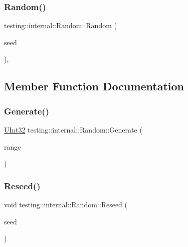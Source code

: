 \subsubsection{\texorpdfstring{Random()}{Random()}}
{\footnotesize\ttfamily testing\+::internal\+::\+Random\+::\+Random (\begin{DoxyParamCaption}\item[{\mbox{\hyperlink{namespacetesting_1_1internal_a40d4fffcd2bf56f18b1c380615aa85e3}{U\+Int32}}}]{seed }\end{DoxyParamCaption})\hspace{0.3cm}{\ttfamily [inline]}, {\ttfamily [explicit]}}



\subsection{Member Function Documentation}
\mbox{\label{classtesting_1_1internal_1_1_random_a9315b7fb621cbcfdf92ed4b5e584c0db}} 
\subsubsection{\texorpdfstring{Generate()}{Generate()}}
{\footnotesize\ttfamily \mbox{\hyperlink{namespacetesting_1_1internal_a40d4fffcd2bf56f18b1c380615aa85e3}{U\+Int32}} testing\+::internal\+::\+Random\+::\+Generate (\begin{DoxyParamCaption}\item[{\mbox{\hyperlink{namespacetesting_1_1internal_a40d4fffcd2bf56f18b1c380615aa85e3}{U\+Int32}}}]{range }\end{DoxyParamCaption})}

\mbox{\label{classtesting_1_1internal_1_1_random_adf2f24199318a46f885c78f50d89a69e}} 
\subsubsection{\texorpdfstring{Reseed()}{Reseed()}}
{\footnotesize\ttfamily void testing\+::internal\+::\+Random\+::\+Reseed (\begin{DoxyParamCaption}\item[{\mbox{\hyperlink{namespacetesting_1_1internal_a40d4fffcd2bf56f18b1c380615aa85e3}{U\+Int32}}}]{seed }\end{DoxyParamCaption})\hspace{0.3cm}{\ttfamily [inline]}}



